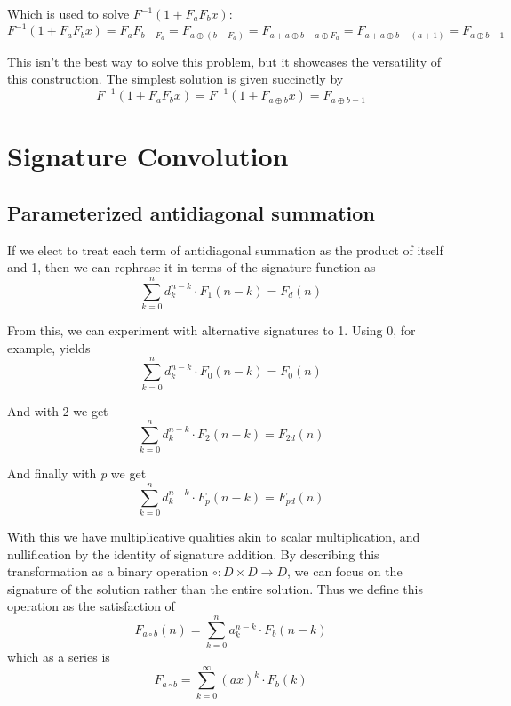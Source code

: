 \documentclass{article}
\begin{document}
\noindent Which is used to solve $F^{-1}(1 + F_{a}F_{b}x)$: \begin{equation}F^{-1}(1+F_{a}F_{b}x) = F_{a}F_{b-F_{a}} = F_{a \oplus (b-F_{a})} = F_{a + a \oplus b - a \oplus F_{a}} = F_{a + a \oplus b - (a+1)} = F_{a \oplus b - 1}\end{equation}

\noindent This isn't the best way to solve this problem, but it showcases the versatility of this construction. The simplest solution is given succinctly by \begin{equation}F^{-1}(1+F_{a}F_{b}x) = F^{-1}(1+F_{a \oplus b}x) = F_{a \oplus b - 1}\end{equation}

\section{Signature Convolution}

\subsection{Parameterized antidiagonal summation}

If we elect to treat each term of antidiagonal summation as the product of itself and 1, then we can rephrase it in terms of the signature function as \begin{equation}\sum_{k=0}^{n} d_{k}^{n-k} \cdot F_{1}(n-k) = F_{d}(n)\end{equation}

\noindent From this, we can experiment with alternative signatures to 1. Using 0, for example, yields \begin{equation}\sum_{k=0}^{n} d_{k}^{n-k} \cdot F_{0}(n-k) = F_{0}(n)\end{equation}

\noindent And with 2 we get \begin{equation}\sum_{k=0}^{n} d_{k}^{n-k} \cdot F_{2}(n-k) = F_{2d}(n)\end{equation}

\noindent And finally with \textit{p} we get \begin{equation}\sum_{k=0}^{n} d_{k}^{n-k} \cdot F_{p}(n-k) = F_{pd}(n)\end{equation}

\noindent With this we have multiplicative qualities akin to scalar multiplication, and nullification by the identity of signature addition. By describing this transformation as a binary operation $\circ : D \times D \rightarrow D$, we can focus on the signature of the solution rather than the entire solution. Thus we define this operation as the satisfaction of \begin{equation}F_{a \circ b}(n) = \sum_{k=0}^{n} a_{k}^{n-k} \cdot F_{b}(n-k)\end{equation} which as a series is \begin{equation}F_{a \circ b} = \sum_{k=0}^{\infty} (ax)^{k} \cdot F_{b}(k)\end{equation}
\end{document}
